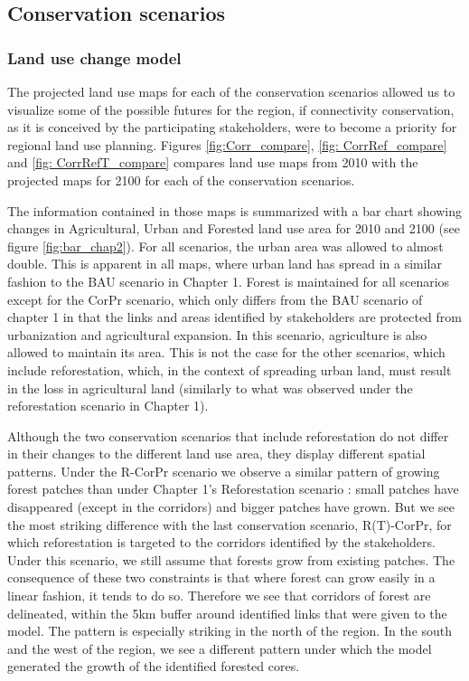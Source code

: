 \subsection{Conservation scenarios}

\subsubsection{Land use change model}

The projected land use maps for each of the conservation scenarios allowed us to visualize some of the possible futures for the region, if connectivity conservation, as it is conceived by the participating stakeholders, were to become a priority for regional land use planning. Figures \ref{fig:Corr_compare}, \ref{fig: CorrRef_compare} and \ref{fig: CorrRefT_compare} compares land use maps from 2010 with the projected maps for 2100 for each of the conservation scenarios.

The information contained in those maps is summarized with a bar chart showing changes in Agricultural, Urban and Forested land use area for 2010 and 2100 (see figure \ref{fig:bar_chap2}). For all scenarios, the urban area was allowed to almost double. This is apparent in all maps, where urban land has spread in a similar fashion to the BAU scenario in Chapter 1. Forest is maintained for all scenarios except for the CorPr scenario, which only differs from the BAU scenario of chapter 1 in that the links and areas identified by stakeholders are protected from urbanization and agricultural expansion. In this scenario, agriculture is also allowed to maintain its area. This is not the case for the other scenarios, which include reforestation, which, in the context of spreading urban land, must result in the loss in agricultural land (similarly to what was observed under the reforestation scenario in Chapter 1).

Although the two conservation scenarios that include reforestation do not differ in their changes to the different land use area, they display different spatial patterns. Under the R-CorPr scenario we observe a similar pattern of growing forest patches than under Chapter 1's Reforestation scenario : small patches have disappeared (except in the corridors) and bigger patches have grown. But we see the most striking difference with the last conservation scenario, R(T)-CorPr, for which reforestation is targeted to the corridors identified by the stakeholders. Under this scenario, we still assume that forests grow from existing patches. The consequence of these two constraints is that where forest can grow easily in a linear fashion, it tends to do so. Therefore we see that corridors of forest are delineated, within the 5km buffer around identified links that were given to the model. The pattern is especially striking in the north of the region. In the south and the west of the region, we see a different pattern under which the model generated the growth of the identified forested cores. \\

